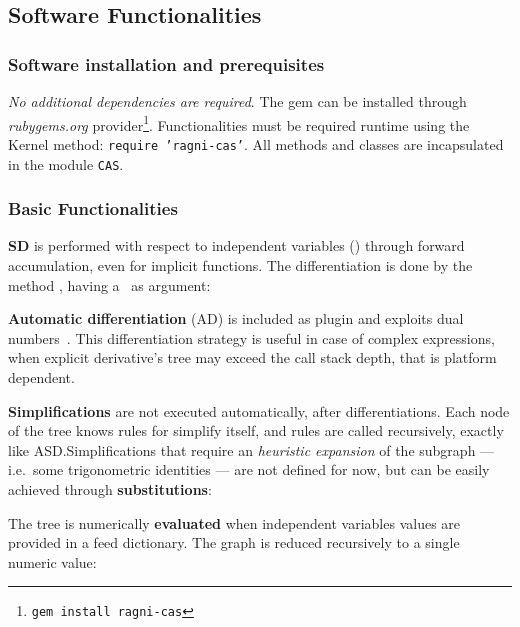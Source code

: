\subsection{Software Functionalities}
\label{sec:functionalities}

\subsubsection{Software installation and prerequisites}

\emph{No additional dependencies are required}. The gem can be installed through \emph{rubygems.org} provider\footnote{\texttt{gem install ragni-cas}}. Functionalities must be required runtime using the Kernel method: \texttt{require 'ragni-cas'}. All methods and classes are incapsulated in the module \texttt{CAS}.

\subsubsection{Basic Functionalities}
\textbf{SD} is performed with respect to independent variables (\CASVariable) through forward accumulation, even for implicit functions. The differentiation is done by the method \CASOpdiff, having a \CASVariable~as argument:

\noindent%


\textbf{Automatic differentiation} (AD) is included as plugin and exploits dual numbers~\cite{bartholomew2000automatic}. This differentiation strategy is useful in case of complex expressions, when explicit derivative's tree may exceed the call stack depth, that is platform dependent.

\textbf{Simplifications} are not executed automatically, after differentiations. Each node of the tree knows rules for simplify itself, and rules are called recursively, exactly like ASD.\@ Simplifications that require an \emph{heuristic expansion} of the subgraph --- i.e.\ some trigonometric identities --- are not defined for now, but can be easily achieved through \textbf{substitutions}:

\noindent%


The tree is numerically \textbf{evaluated} when independent variables values are provided in a feed dictionary. The graph is reduced recursively to a single numeric value:

